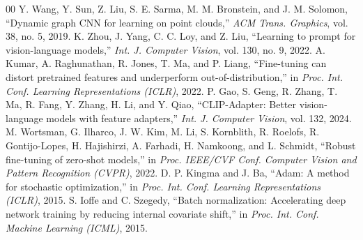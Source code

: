 \documentclass[conference]{IEEEtran}
\begin{document}
\begin{thebibliography}{00}
 Y. Wang, Y. Sun, Z. Liu, S. E. Sarma, M. M. Bronstein, and J. M. Solomon, ``Dynamic graph CNN for learning on point clouds,'' \emph{ACM Trans. Graphics}, vol. 38, no. 5, 2019.
 K. Zhou, J. Yang, C. C. Loy, and Z. Liu, ``Learning to prompt for vision-language models,'' \emph{Int. J. Computer Vision}, vol. 130, no. 9, 2022.
 A. Kumar, A. Raghunathan, R. Jones, T. Ma, and P. Liang, ``Fine-tuning can distort pretrained features and underperform out-of-distribution,'' in \emph{Proc. Int. Conf. Learning Representations (ICLR)}, 2022.
 P. Gao, S. Geng, R. Zhang, T. Ma, R. Fang, Y. Zhang, H. Li, and Y. Qiao, ``CLIP-Adapter: Better vision-language models with feature adapters,'' \emph{Int. J. Computer Vision}, vol. 132, 2024.
 M. Wortsman, G. Ilharco, J. W. Kim, M. Li, S. Kornblith, R. Roelofs, R. Gontijo-Lopes, H. Hajishirzi, A. Farhadi, H. Namkoong, and L. Schmidt, ``Robust fine-tuning of zero-shot models,'' in \emph{Proc. IEEE/CVF Conf. Computer Vision and Pattern Recognition (CVPR)}, 2022.
 D. P. Kingma and J. Ba, ``Adam: A method for stochastic optimization,'' in \emph{Proc. Int. Conf. Learning Representations (ICLR)}, 2015.
 S. Ioffe and C. Szegedy, ``Batch normalization: Accelerating deep network training by reducing internal covariate shift,'' in \emph{Proc. Int. Conf. Machine Learning (ICML)}, 2015.
\end{thebibliography}
\end{document}
